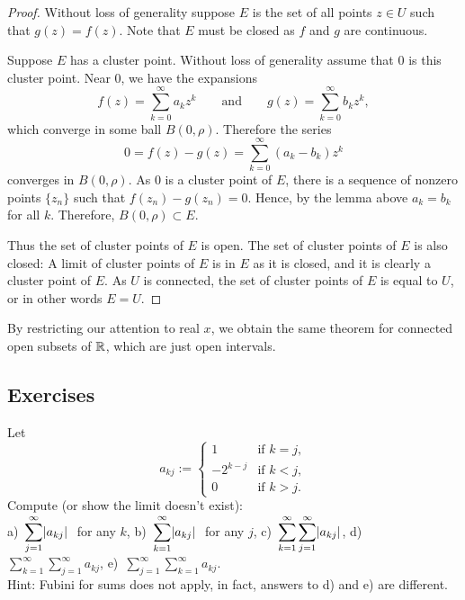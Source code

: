\begin{proof}
Without loss of generality suppose $E$ is the set of all points $z \in U$ such that
$g(z)=f(z)$.  Note that $E$ must be closed as $f$ and $g$ are continuous.

Suppose $E$ has a cluster point.  Without loss of generality assume that $0$
is this cluster point.  Near $0$,
we have the expansions
\begin{equation*}
f(z) = \sum_{k=0}^\infty a_k {z}^k 
\qquad
\text{and}
\qquad
g(z) = \sum_{k=0}^\infty b_k {z}^k ,
\end{equation*}
which converge in some ball $B(0,\rho)$.  Therefore the series
\begin{equation*}
0 = f(z)-g(z) = 
\sum_{k=0}^\infty (a_k-b_k) z^k
\end{equation*}
converges in $B(0,\rho)$.  As $0$ is a cluster point of $E$, there
is a sequence of nonzero points $\{ z_n \}$ such that
$f(z_n) -g(z_n) = 0$.  Hence, by the lemma above 
$a_k = b_k$ for all $k$.  Therefore, $B(0,\rho) \subset E$.

Thus the set of cluster points of $E$ is open.  The set of cluster points
of $E$ is also closed: A limit of cluster points of $E$ is in $E$
as it is closed, and it is clearly a cluster point of $E$.
As $U$ is connected, the set of cluster points of $E$
is equal to $U$, or in other words $E = U$.
\end{proof}

By restricting our attention to real $x$, we obtain the same
theorem for connected open subsets of ${\mathbb{R}}$, which are just open intervals.

\subsection{Exercises}

\begin{exercise}
Let
\begin{equation*}
a_{kj} :=
\begin{cases}
1        & \text{if } k=j,\\
-2^{k-j} & \text{if } k<j,\\
0        & \text{if } k>j.
\end{cases}
\end{equation*}
Compute (or show the limit doesn't exist):
\\
a)~$\displaystyle \sum_{j=1}^\infty \lvert {a_{kj}} \rvert~$ for any $k$,
\hspace{\fill}
b)~$\displaystyle \sum_{k=1}^\infty \lvert {a_{kj}} \rvert~$ for any $j$,
\hspace{\fill}
c)~$\displaystyle \sum_{k=1}^\infty \sum_{j=1}^\infty \lvert {a_{kj}} \rvert$,
\hspace{\fill}
d)~$\displaystyle \sum_{k=1}^\infty \sum_{j=1}^\infty a_{kj}$,
\hspace{\fill}
e)~$\displaystyle \sum_{j=1}^\infty \sum_{k=1}^\infty a_{kj}$.
\\
Hint: Fubini for sums does not apply, in fact, answers to
d) and e) are different.
\end{exercise}

